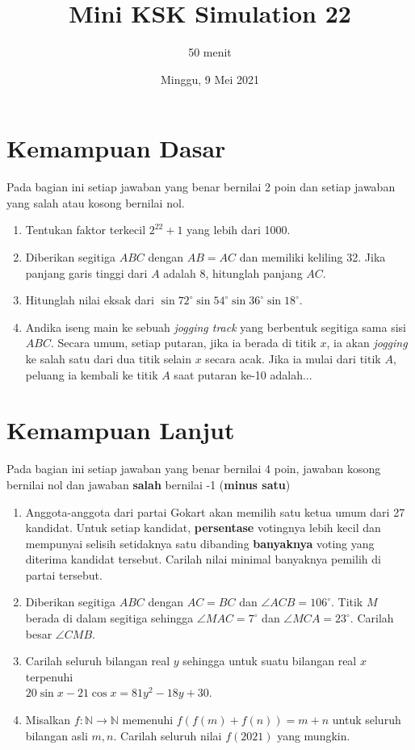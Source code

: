 \documentclass[12pt]{scrartcl}
\title{Mini KSK Simulation 22}
\author{50 menit}
\date{Minggu, 9 Mei 2021}
\begin{document}
	\maketitle

\renewcommand*\contentsname{Daftar Isi}
\tableofcontents

\newpage
	
	\section{Kemampuan Dasar}
	Pada bagian ini setiap jawaban yang benar bernilai 2 poin dan setiap jawaban yang salah
	atau kosong bernilai nol.
	\begin{enumerate}
		\item Tentukan faktor terkecil $2^{22}+1$ yang lebih dari 1000.
		\item Diberikan segitiga $ABC$ dengan $AB=AC$ dan memiliki keliling 32. Jika panjang garis tinggi dari $A$ adalah 8, hitunglah panjang $AC$.
		\item Hitunglah nilai eksak dari $\sin 72^\circ \sin 54^\circ \sin 36^\circ \sin 18^\circ.$
		\item Andika iseng main ke sebuah \textit{jogging track} yang berbentuk segitiga sama sisi $ABC$. Secara umum, setiap putaran, jika ia berada di titik $x$, ia akan \textit{jogging} ke salah satu dari dua titik selain $x$ secara acak. Jika ia mulai dari titik $A$, peluang ia kembali ke titik $A$ saat putaran ke-10 adalah...
		
		
	\end{enumerate}

\section{Kemampuan Lanjut}
Pada bagian ini setiap jawaban yang benar bernilai 4 poin, jawaban kosong bernilai nol
dan jawaban \textbf{salah} bernilai -1 (\textbf{minus satu})

\begin{enumerate}[resume]
		\item Anggota-anggota dari partai Gokart akan memilih satu ketua umum dari 27 kandidat. Untuk setiap kandidat, \textbf{persentase} votingnya lebih kecil dan mempunyai selisih setidaknya satu  dibanding \textbf{banyaknya} voting yang diterima kandidat tersebut. Carilah nilai minimal banyaknya pemilih di partai tersebut. 
		
		\item Diberikan segitiga $ ABC $ dengan $ AC = BC $ dan $ \angle ACB = 106^\circ. $ Titik $ M $ berada di dalam segitiga sehingga $ \angle MAC = 7^\circ $ dan $ \angle MCA = 23^\circ. $ Carilah besar $ \angle CMB. $
		
		\item Carilah seluruh bilangan real $y$ sehingga untuk suatu bilangan real $x$ terpenuhi\\ $20\sin x-21\cos x=81y^2-18y+30.$
		
		\item Misalkan $f:\mathbb{N}\rightarrow\mathbb{N}$ memenuhi $f(f(m)+f(n))=m+n$ untuk seluruh bilangan asli $m,n$. Carilah seluruh nilai $f(2021)$ yang mungkin.
\end{enumerate}
\end{document}
